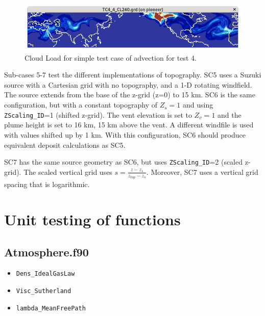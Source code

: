 \begin{figure}[htbp]
\includegraphics[angle=0,scale=0.64]{Figures/Apx_Test/Test_044_CL.png}
\parbox{15cm}{\caption{\label{FigTest_DiffTC4_CL}
Cloud Load for simple test case of advection for test 4.
}}
\end{figure}

Sub-cases 5-7 test the different implementations of topography.
SC5 uses a Suzuki source with a Cartesian grid with no topography,
and a 1-D rotating windfield.
The source extends from the base of the z-grid (z=0) to 15 km.
SC6 is the same configuration, but with a constant topography of
$Z_s = 1$ and using \texttt{ZScaling\_ID}=1 (shifted z-grid). The vent
elevation is set to $Z_v = 1$ and the plume height is set to 16 km, 15 km
above the vent.  A different windfile is used with values shifted up by
1 km. With this configuration, SC6 should produce equivalent deposit
calculations as SC5.

SC7 has the same source geometry as SC6, but uses
\texttt{ZScaling\_ID}=2 (scaled z-grid). The scaled vertical
grid uses $s=\frac{z-z_s}{z_{top}-z_s}$. Moreover, SC7 uses
a vertical grid spacing that is logarithmic. 

\clearpage
\section{Unit testing of functions}
\subsection{Atmosphere.f90}
\begin{itemize}
 \item \texttt{Dens\_IdealGasLaw}
 \item \texttt{Visc\_Sutherland}
 \item \texttt{lambda\_MeanFreePath}
\end{itemize}
